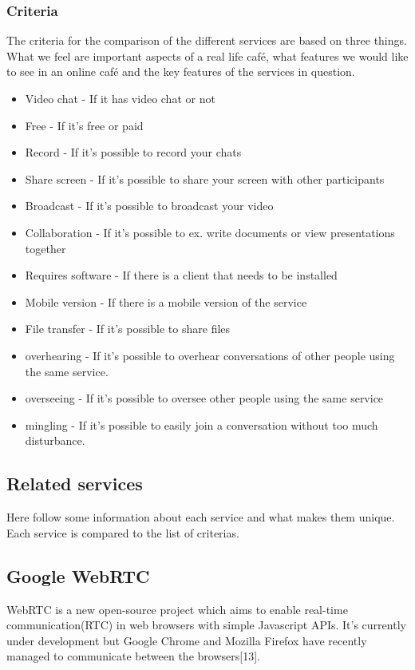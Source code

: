 \documentclass[12pt, titlepage]{article}
\begin{document}
\subsubsection{Criteria}
The criteria for the comparison of the different services are based on three things. What we feel are important aspects of a real life café, what features we would like to see in an online café and the key features of the services in question.
\begin{itemize}
\item Video chat - If it has video chat or not
\item Free - If it’s free or paid
\item Record - If it’s possible to record your chats
\item Share screen - If it’s possible to share your screen with other participants
\item Broadcast - If it’s possible to broadcast your video
\item Collaboration - If it’s possible to ex. write documents or view presentations together
\item Requires software - If there is a client that needs to be installed
\item Mobile version - If there is a mobile version of the service
\item File transfer - If it’s possible to share files
\item overhearing - If it’s possible to overhear conversations of other people using the same service.
\item overseeing - If it’s possible to oversee other people using the same service
\item mingling - If it’s possible to easily join a conversation without too much disturbance.
\end{itemize}
\subsection{Related services}
Here follow some information about each service and what makes them unique. Each service is compared to the list of criterias.
\subsection{Google WebRTC}
WebRTC is a new open-source project which aims to enable real-time communication(RTC) in web browsers with simple Javascript APIs. It’s currently under development but Google Chrome and Mozilla Firefox have recently managed to communicate between the browsers[13].
\end{document}
